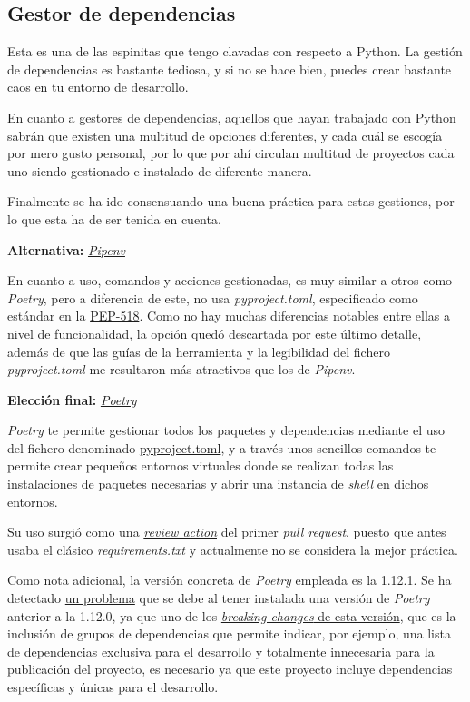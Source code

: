 \subsection{Gestor de dependencias}

Esta es una de las espinitas que tengo clavadas con respecto a Python. La gestión de dependencias es bastante tediosa, y si no se hace bien, puedes crear bastante caos en tu entorno de desarrollo.

En cuanto a gestores de dependencias, aquellos que hayan trabajado con Python sabrán que existen una multitud de opciones diferentes, y cada cuál se escogía por mero gusto personal, por lo que por ahí circulan multitud de proyectos cada uno siendo gestionado e instalado de diferente manera.

Finalmente se ha ido consensuando una buena práctica para estas gestiones, por lo que esta ha de ser tenida en cuenta.

\textbf{Alternativa:} \href{https://pipenv-es.readthedocs.io/es/latest/}{\textit{Pipenv}}

En cuanto a uso, comandos y acciones gestionadas, es muy similar a otros como \textit{Poetry}, pero a diferencia de este, no usa \textit{pyproject.toml}, especificado como estándar en la \href{https://peps.python.org/pep-0518/}{PEP-518}. Como no hay muchas diferencias notables entre ellas a nivel de funcionalidad, la opción quedó descartada por este último detalle, además de que las guías de la herramienta y la legibilidad del fichero \textit{pyproject.toml} me resultaron más atractivos que los de \textit{Pipenv}.

\textbf{Elección final:} \href{https://python-poetry.org/}{\textit{Poetry}}

\textit{Poetry} te permite gestionar todos los paquetes y dependencias mediante el uso del fichero denominado \href{https://github.com/Anglepi/My-Many-Reads/blob/main/pyproject.toml}{pyproject.toml}, y a través unos sencillos comandos te permite crear pequeños entornos virtuales donde se realizan todas las instalaciones de paquetes necesarias y abrir una instancia de \textit{shell} en dichos entornos.

Su uso surgió como una \href{https://github.com/Anglepi/My-Many-Reads/pull/39#discussion_r974230463}{\textit{review action}} del primer \textit{pull request}, puesto que antes usaba el clásico \textit{requirements.txt} y actualmente no se considera la mejor práctica.

Como nota adicional, la versión concreta de \textit{Poetry} empleada es la 1.12.1. Se ha detectado \href{https://github.com/Anglepi/My-Many-Reads/issues/125}{un problema} que se debe al tener instalada una versión de \textit{Poetry} anterior a la 1.12.0, ya que uno de los \href{https://python-poetry.org/blog/announcing-poetry-1.2.0/}{\textit{breaking changes} de esta versión}, que es la inclusión de grupos de dependencias que permite indicar, por ejemplo, una lista de dependencias exclusiva para el desarrollo y totalmente innecesaria para la publicación del proyecto, es necesario ya que este proyecto incluye dependencias específicas y únicas para el desarrollo.

